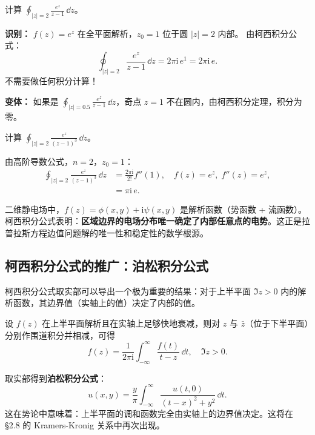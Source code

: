 \begin{example}
计算 $\displaystyle\oint_{|z|=2} \frac{e^z}{z-1}\,\dd z$。

\textbf{识别：} $f(z)=e^z$ 在全平面解析，$z_0=1$ 位于圆 $|z|=2$ 内部。
由柯西积分公式：
\begin{equation}
\oint_{|z|=2} \frac{e^z}{z-1}\,\dd z = 2\pi\mathrm{i}\, e^1 = 2\pi\mathrm{i}\, e.
\end{equation}
不需要做任何积分计算！

\textbf{变体：} 如果是 $\oint_{|z|=0.5} \frac{e^z}{z-1}\,\dd z$，奇点 $z=1$ 不在圆内，由柯西积分定理，积分为零。
\end{example}

\begin{example}[高阶导数公式的应用]
计算 $\displaystyle\oint_{|z|=2} \frac{e^z}{(z-1)^3}\,\dd z$。

由高阶导数公式，$n=2$，$z_0=1$：
\begin{align*}
\oint_{|z|=2} \frac{e^z}{(z-1)^3}\,\dd z
&= \frac{2\pi\mathrm{i}}{2!} f''(1),\quad f(z)=e^z,\; f''(z)=e^z,\\
&= \pi\mathrm{i}\, e.
\end{align*}
\end{example}

\begin{insight}[柯西积分公式的物理解读]
二维静电场中，$f(z) = \phi(x,y) + \mathrm{i}\psi(x,y)$ 是解析函数（势函数 + 流函数）。柯西积分公式表明：\textbf{区域边界的电场分布唯一确定了内部任意点的电势}。这正是拉普拉斯方程边值问题解的唯一性和稳定性的数学根源。
\end{insight}

\subsection{柯西积分公式的推广：泊松积分公式}

柯西积分公式取实部可以导出一个极为重要的结果：对于上半平面 $\Im z > 0$ 内的解析函数，其边界值（实轴上的值）决定了内部的值。

设 $f(z)$ 在上半平面解析且在实轴上足够快地衰减，则对 $z$ 与 $\bar z$（位于下半平面）分别作围道积分并相减，可得
\begin{equation}
f(z) = \frac{1}{2\pi\mathrm{i}}\int_{-\infty}^{\infty} \frac{f(t)}{t-z}\,\dd t,\quad \Im z > 0.
\end{equation}

取实部得到\textbf{泊松积分公式}：
\begin{equation}
u(x,y) = \frac{y}{\pi}\int_{-\infty}^{\infty} \frac{u(t,0)}{(t-x)^2 + y^2}\,\dd t.
\end{equation}
这在势论中意味着：上半平面的调和函数完全由实轴上的边界值决定。这将在 \S2.8 的 Kramers-Kronig 关系中再次出现。

